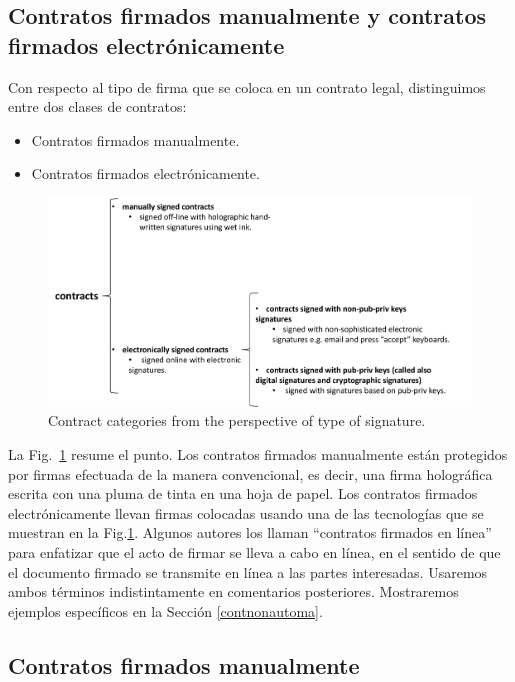 \documentclass[12pt]{report} %
\begin{document}
    \subsection{Contratos firmados manualmente y contratos firmados electrónicamente}

Con respecto al tipo de firma que se coloca en un contrato legal, distinguimos entre
dos clases de contratos:

\begin{itemize}
    \item Contratos firmados manualmente.

    \item Contratos firmados electrónicamente.
    
\end{itemize}


\begin{figure}
\centering
\includegraphics[width=0.98\columnwidth]{figures/contcatesigntype.pdf}
\caption{Contract categories from the perspective of 
 type of signature.}
\label{fig:concatesigntype}
\end{figure}

La Fig.~\ref{fig:concatesigntype} resume el punto. Los contratos firmados manualmente están protegidos por firmas efectuada de la manera convencional, es decir, una firma holográfica escrita con una pluma de tinta en una hoja de papel. Los contratos firmados electrónicamente llevan firmas colocadas usando una de las tecnologías que se muestran en la Fig.\ref{fig:concatesigntype}. Algunos autores los llaman “contratos firmados en línea” para enfatizar que el acto de firmar se lleva a cabo en línea, en el sentido de que el documento firmado se transmite en línea a las partes interesadas. Usaremos ambos términos indistintamente en comentarios posteriores. Mostraremos ejemplos específicos en la Sección \ref{contnonautoma}.


\subsection{Contratos firmados manualmente }
\end{document}
